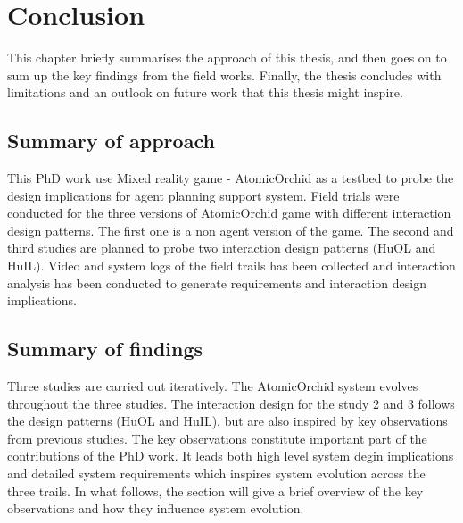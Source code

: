 \chapter{Conclusion}

This chapter briefly summarises the approach of this thesis, and then goes on to sum up the key findings from the field works. Finally, the thesis concludes with limitations and an outlook on future work that this thesis might inspire.\\

\section{Summary of approach}
This PhD work use Mixed reality game - AtomicOrchid as a testbed to probe the design implications for agent planning support system. Field trials were conducted for the three versions of AtomicOrchid game with different interaction design patterns. The first one is a non agent version of the game. The second and third studies are planned to probe two interaction design patterns (HuOL and HuIL). Video and system logs of the field trails has been collected and interaction analysis has been conducted to generate requirements and interaction design implications. \\


\section{Summary of findings}
Three studies are carried out iteratively. The AtomicOrchid system evolves throughout the three studies. The interaction design for the study 2 and 3 follows the design patterns (HuOL and HuIL), but are also inspired by key observations from previous studies. The key observations constitute important part of the contributions of the PhD work. It leads both high level system degin implications and detailed system requirements which inspires system evolution across the three trails. In what follows, the section will give a brief overview of the key observations and how they influence system evolution. \\ 

